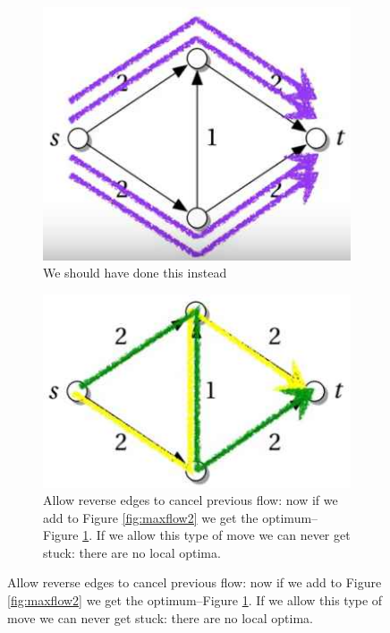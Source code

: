 \documentclass[]{article}
\begin{document}
\begin{figure}[H]
\begin{subfigure}[t]{0.55\textwidth}
	\end{subfigure}
	\;\;\;
	\begin{subfigure}[t]{0.45\textwidth}
		\caption{We should have done this instead}\label{fig:maxflow3}
		\includegraphics[width=\textwidth]{maxflow3}
	\end{subfigure}
	\;\;\;
	\begin{subfigure}[t]{0.45\textwidth}
		\caption{Allow reverse edges to cancel previous flow: now if we add to Figure \ref{fig:maxflow2} we get the optimum--Figure \ref{fig:maxflow3}. If we allow this type of move we can never get stuck: there are no local optima.}
		\includegraphics[width=\textwidth]{maxflow4}
	\end{subfigure}
\end{figure}
\end{document}
